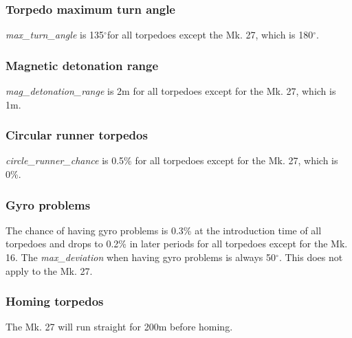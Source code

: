 \documentclass{article}
\newcommand{\degree}{$^{\circ}$}
\begin{document}
\subsubsection{Torpedo maximum turn angle}
\emph{max\_turn\_angle} is 135\degree for all torpedoes except the Mk. 27, which is 180\degree.
\subsubsection{Magnetic detonation range}
\emph{mag\_detonation\_range} is 2m for all torpedoes except for the Mk. 27, which is 1m.
\subsubsection{Circular runner torpedos}
\emph{circle\_runner\_chance} is 0.5\% for all torpedoes except for the Mk. 27, which is 0\%.
\subsubsection{Gyro problems}
The chance of having gyro problems is 0.3\% at the introduction time of all torpedoes and drops to 0.2\% in later periods for all torpedoes except for the Mk. 16. The \emph{max\_deviation} when having gyro problems is always 50\degree. This does not apply to the Mk. 27. 
\subsubsection{Homing torpedos}
The Mk. 27 will run straight for 200m before homing.
\end{document}
